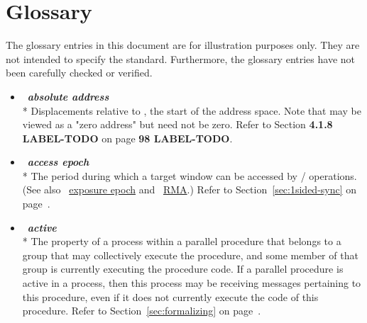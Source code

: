 %
%
%
%
%
%


\chapter{Glossary}
\label{glossary}

The glossary entries in this document are for illustration purposes only. They are not
intended to specify the standard.  Furthermore, the glossary entries have not been
carefully checked or verified.


\begin{itemize}

\label {glossary:absolute_address}
\item  ~\hypertarget{glossary:absolute_address}{\emph{\textbf{absolute address}}} \\*
Displacements relative to  , 
the start of the address space. Note that  
may be viewed as a "zero address" but need not be zero.
Refer to Section {\bf 4.1.8 LABEL-TODO} on page {\bf 98 LABEL-TODO}.

\label{glossary:access_epoch}
\item  ~\hypertarget{glossary:access_epoch}{\emph{\textbf{access epoch}}} \\*
The period during which a target window can be accessed by \RMA/
operations.
(See also ~\hyperlink{glossary:exposure_epoch}{exposure epoch} and
 ~\hyperlink{glossary:RMA}{RMA}.)
Refer to Section~\ref{sec:1sided-sync} on page~\pageref{sec:1sided-sync}.

\label{glossary:active}
\item  ~\hypertarget{glossary:active}{\emph{\textbf{active}}} \\*
The property of a process within a parallel procedure that
belongs to a group that may collectively execute the procedure, and
some member of that group is currently executing the procedure code.
If a parallel procedure is active in a process, then this process may
be receiving messages pertaining to this procedure, even if it
does not currently execute the code of this procedure.
Refer to Section~\ref{sec:formalizing} on page~\pageref{sec:formalizing}.


\end{itemize}
